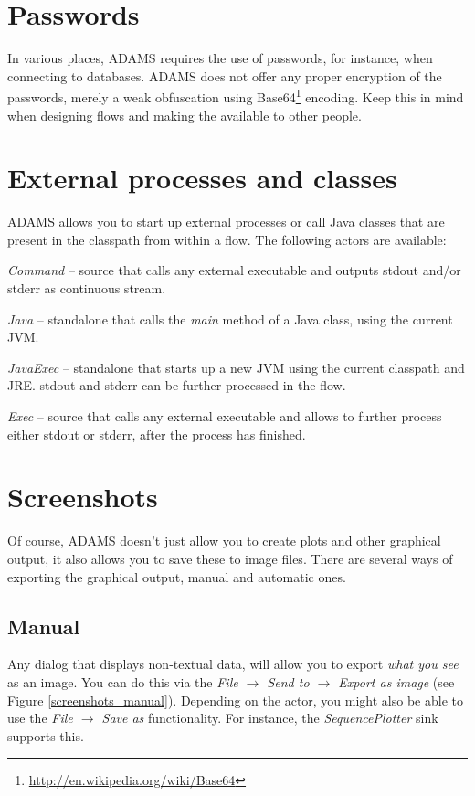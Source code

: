 \newpage
\section{Passwords}
In various places, ADAMS requires the use of passwords, for instance, when
connecting to databases. ADAMS does not offer any proper encryption of the 
passwords, merely a weak obfuscation using 
Base64\footnote{\url{http://en.wikipedia.org/wiki/Base64}{}} encoding. Keep 
this in mind when designing flows and making the available to other people.


\newpage
\section{External processes and classes}
ADAMS allows you to start up external processes or call Java classes that
are present in the classpath from within a flow. The following actors are 
available:
\begin{tight_itemize}
	\item \textit{Command} -- source that calls any external executable and
	outputs stdout and/or stderr as continuous stream.
	\item \textit{Java} -- standalone that calls the \textit{main} method of a
	Java class, using the current JVM.
	\item \textit{JavaExec} -- standalone that starts up a new JVM using
	the current classpath and JRE. stdout and stderr can be further processed
	in the flow.
	\item \textit{Exec} -- source that calls any external executable and allows
	to further process either stdout or stderr, after the process has finished.
\end{tight_itemize}


\newpage
\section{Screenshots}
\label{screenshots}
Of course, ADAMS doesn't just allow you to create plots and other graphical
output, it also allows you to save these to image files. There are several
ways of exporting the graphical output, manual and automatic ones.

\subsection{Manual}
Any dialog that displays non-textual data, will allow you to export
\textit{what you see} as an image. You can do this via the
\textit{File $\rightarrow$ Send to $\rightarrow$ Export as image} (see Figure
\ref{screenshots_manual}). Depending on the actor, you might also be able to
use the \textit{File $\rightarrow$ Save as} functionality. For instance,
the \textit{SequencePlotter} sink supports this.

